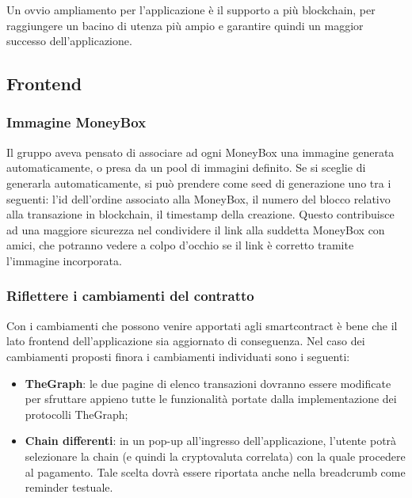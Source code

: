 Un ovvio ampliamento per l'applicazione è il supporto a più blockchain, per raggiungere un bacino di utenza più ampio e garantire quindi un maggior successo dell'applicazione.\\


\subsection{Frontend}

\subsubsection{Immagine MoneyBox}

Il gruppo aveva pensato di associare ad ogni MoneyBox una immagine generata automaticamente, o presa da un pool di immagini definito. Se si sceglie di generarla automaticamente, si può prendere come seed di generazione uno tra i seguenti: l'id dell'ordine associato alla MoneyBox, 
il numero del blocco relativo alla transazione in blockchain, il timestamp della creazione.
Questo contribuisce ad una maggiore sicurezza nel condividere il link alla suddetta MoneyBox con amici, che potranno vedere a colpo d'occhio se il link è corretto tramite l'immagine incorporata.

\subsubsection{Riflettere i cambiamenti del contratto}

Con i cambiamenti che possono venire apportati agli smartcontract è bene che il lato frontend dell'applicazione sia aggiornato di conseguenza.
Nel caso dei cambiamenti proposti finora i cambiamenti individuati sono i seguenti:
\begin{itemize}
    \item \textbf{TheGraph}: le due pagine di elenco transazioni dovranno essere modificate per sfruttare appieno tutte le funzionalità portate dalla implementazione dei protocolli TheGraph;
    \item \textbf{Chain differenti}:  in un pop-up all'ingresso dell'applicazione, l'utente potrà selezionare la chain (e quindi la cryptovaluta correlata) con la quale procedere al pagamento. Tale scelta dovrà essere riportata anche nella breadcrumb come reminder testuale.
\end{itemize}


